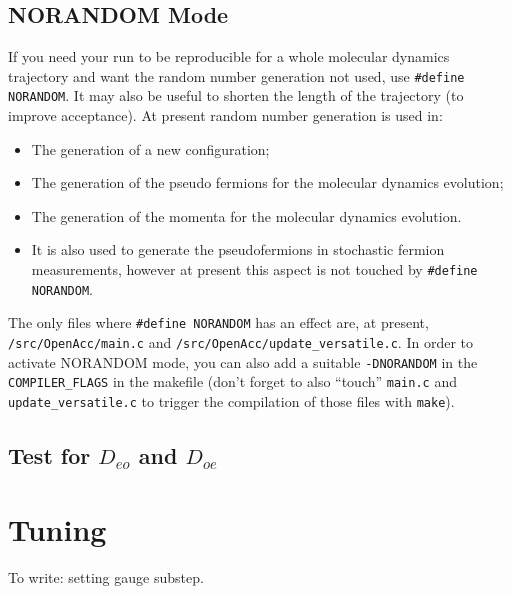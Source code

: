 \documentclass[a4paper,10pt]{book}
\begin{document}
  \subsection{ NORANDOM Mode}
  If you need your run to be reproducible for a whole molecular dynamics 
trajectory and want the random number generation not used, use 
\verb|#define NORANDOM|. It may also be useful to shorten the length of the 
trajectory (to improve acceptance).
At present random number generation is used in:
\begin{itemize}
 \item The generation of a new configuration;
 \item The generation of the pseudo fermions for the molecular dynamics 
evolution;
 \item The generation of the momenta for the molecular dynamics evolution.
 \item It is also used to generate the pseudofermions in stochastic fermion 
measurements, however at present this aspect is not touched by 
\verb|#define NORANDOM|.
\end{itemize}
The only files where \verb|#define NORANDOM| has an effect are, at present, 
\verb|/src/OpenAcc/main.c| and \verb|/src/OpenAcc/update_versatile.c|. In order 
to activate NORANDOM mode, you can also add a suitable \verb|-DNORANDOM| in the 
\verb|COMPILER_FLAGS| in the makefile (don't forget to also ``touch'' 
\verb|main.c| and \verb|update_versatile.c| to trigger the compilation of those 
files with \verb|make|).

\subsection{Test for $D_{eo}$ and $D_{oe}$}


\section{Tuning}
To write: setting gauge substep.
\end{document}

